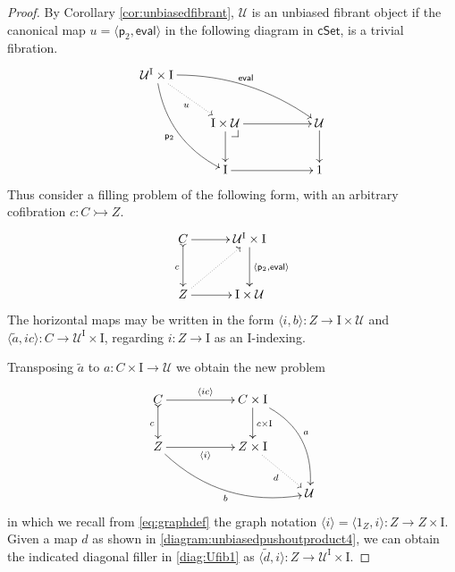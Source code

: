 \documentclass[11pt]{amsart}
\makeatletter
\newcommand{\cSet}{\ensuremath{\mathsf{cSet}}}
\newcommand{\proj}{\ensuremath{\mathsf{p}}}%
\newcommand{\ra}{\ensuremath{\rightarrow}}
\newcommand{\cof}{\ensuremath{\rightarrowtail}}
\renewcommand{\to}{\ensuremath{\rightarrow}}
\newcommand{\gph}[1]{\ensuremath{\langle #1 \rangle}}
\newcommand{\I}{\ensuremath{\mathrm{I}}}
\newcommand{\U}{\ensuremath{\mathcal{U}}}
\theoremstyle{remark}
\theoremstyle{definition}
\newcommand{\pbcorner}[1][dr]{\save*!/#1-1.2pc/#1:(-1,1)@^{|-}\restore}
\makeatother
\begin{document}
\begin{proof}
By Corollary \ref{cor:unbiasedfibrant}, $\U$ is an unbiased fibrant object if the canonical map $u = \langle \proj_2, \mathsf{eval}\rangle$ in the following diagram in $\cSet$, is a trivial fibration.
\begin{equation}\label{diagram:Uunbiasedfibrant}
\xymatrix{
\U^\I\times \I \ar@/^3ex/ [rrrd]^{\mathsf{eval}} \ar@/_3ex/ [rdd]_{\proj_2} \ar@{..>}[rd]_{u}  && \\
& \I\times \U \pbcorner  \ar[d] \ar[rr] && \U \ar[d] \\
& \I \ar[rr] && 1
}
\end{equation}
%
Thus consider a filling problem of the following form, with an arbitrary cofibration $c:C \cof Z$.
\begin{equation}\label{diag:Ufib1}
\xymatrix@=3em{
C \ar@{>->}[d]_c \ar[r] & \U^\I\times \I \ar[d]^{\langle \proj_2, \mathsf{eval}\rangle} \\
Z  \ar@{..>}[ru] \ar[r]  & \I\times\U  \\
}
\end{equation}
%
The horizontal maps may be written in the form $\langle i, b\rangle : Z \to \I\times \U$ and $\langle \tilde{a} , ic\rangle : C \to \U^\I\times\I$, regarding $i : Z \to \I$ as an $\I$-indexing.

Transposing $\tilde{a}$ to $a : C\times \I \ra \U$ we obtain the new problem
%
\begin{equation}\label{diagram:unbiasedpushoutproduct4}
\xymatrix{
C \ar@{>->}[d]_{c} \ar[rr]^{\gph{ic}} && C\times \I \ar[d]^{c\times\I} \ar@/^4ex/ [rdd]^{a} \\
Z \ar@/_4ex/ [rrrd]_{b} \ar[rr]_{\gph{i}} &&  Z\times\I  \ar@{.>}[rd]_{d} \\
&&& \U
}
\end{equation}
in which we recall from \eqref{eq:graphdef} the graph notation $\gph{i} = \gph{1_Z, i} : Z \to Z\times \I$.
Given a map $d$ as shown in \eqref{diagram:unbiasedpushoutproduct4}, we can obtain the indicated diagonal filler in \eqref{diag:Ufib1} as  $\langle \tilde{d} , i\rangle : Z \to \U^\I\times\I$.


\end{proof}
\end{document}
